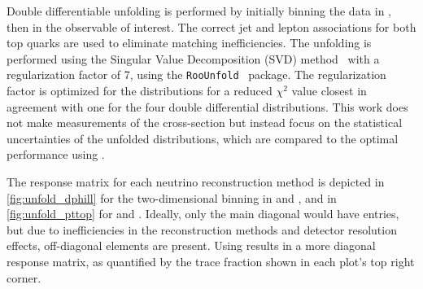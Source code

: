 Double differentiable unfolding is performed by initially binning the data in \mttbar, then in the observable of interest.
The correct jet and lepton associations for both top quarks are used to eliminate matching inefficiencies.
The unfolding is performed using the Singular Value Decomposition (SVD) method~\cite{SVDApproachData} with a regularization factor of 7, using the \texttt{RooUnfold}~\cite{ComparisonUnfoldingMethods} package.
The regularization factor is optimized for the \vtruth distributions for a reduced $\chi^2$ value closest in agreement with one for the four double differential distributions.
This work does not make measurements of the cross-section but instead focus on the statistical uncertainties of the unfolded distributions, which are compared to the optimal performance using \vtruth.

\begin{table}[htbp]
    \centering
    \caption{Kinematic observables of the reconstructed \ttbar system studied for an unfolding analysis in dilepton events and their bin edges.}
    \label{tab:diff_observables}
\end{table}

The response matrix for each neutrino reconstruction method is depicted in \cref{fig:unfold_dphill} for the two-dimensional binning in \mttbar and \dphill, and in \cref{fig:unfold_pttop} for \mttbar and \pttop.
Ideally, only the main diagonal would have entries, but due to inefficiencies in the reconstruction methods and detector resolution effects, off-diagonal elements are present.
Using \vvflows results in a more diagonal response matrix, as quantified by the trace fraction shown in each plot's top right corner.


